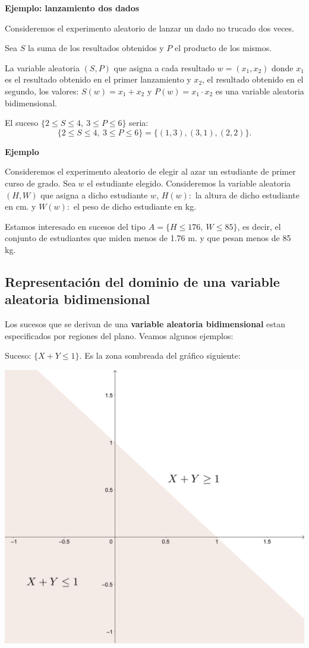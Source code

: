 \documentclass[]{book}
\begin{document}
\textbf{Ejemplo: lanzamiento dos dados}

Consideremos el experimento aleatorio de lanzar un dado no trucado dos veces.

Sea \(S\) la suma de los resultados obtenidos y \(P\) el producto de los mismos.

La variable aleatoria \((S,P)\) que asigna a cada resultado \(w=(x_1,x_2)\) donde \(x_1\) es el resultado obtenido en el primer lanzamiento y \(x_2\), el resultado obtenido en el segundo, los valores: \(S(w)=x_1+x_2\) y \(P(w)=x_1\cdot x_2\) es una variable aleatoria bidimensional.

El suceso \(\{2\leq S\leq 4,\ 3\leq P\leq 6\}\) seria:
\[
\{2\leq S\leq 4,\ 3\leq P\leq 6\} = \{(1,3),(3,1),(2,2)\}.
\]

\textbf{Ejemplo}

Consideremos el experimento aleatorio de elegir al azar un estudiante de primer curso de grado. Sea \(w\) el estudiante elegido. Consideremos la variable aleatoria \((H,W)\) que asigna a dicho estudiante \(w\), \(H(w):\) la altura de dicho estudiante en cm. y \(W(w):\) el peso de dicho estudiante en kg.

Estamos interesado en sucesos del tipo \(A=\{H\leq 176,\ W\leq 85\}\), es decir, el conjunto de estudiantes que miden menos de 1.76 m. y que pesan menos de 85 kg.

\hypertarget{representaciuxf3n-del-dominio-de-una-variable-aleatoria-bidimensional}{%
\subsection{Representación del dominio de una variable aleatoria bidimensional}\label{representaciuxf3n-del-dominio-de-una-variable-aleatoria-bidimensional}}

Los sucesos que se derivan de una \textbf{variable aleatoria bidimensional} estan especificados por regiones del plano.
Veamos algunos ejemplos:

Suceso: \(\{X+Y\leq 1\}\). Es la zona sombreada del gráfico siguiente:

\includegraphics{Images/Bidim1.png}
\end{document}
